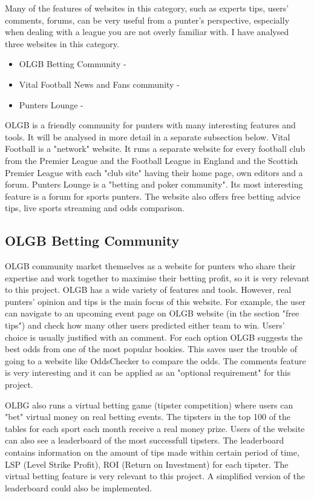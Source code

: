 Many of the features of websites in this category, such as experts tips, users' comments, forums, can be very useful from a punter's perspective, especially when dealing with a league you are not overly familiar with. I have analysed three websites in this category.
	
\begin{itemize}
	\item OLGB Betting Community - \citep{source:olgb}
	\item Vital Football News and Fans community - \citep{source:vitalfootball}
	\item Punters Lounge - \citep{source:punterslounge}
\end{itemize}

OLGB is a friendly community for punters with many interesting features and tools. It will be analysed in more detail in a separate subsection below. Vital Football is a "network" website. It runs a separate website for every football club from the Premier League and the Football League in England and the Scottish Premier League with each "club site" having their home page, own editors and a forum. Punters Lounge is a "betting and poker community". Its most interesting feature is a forum for sports punters. The website also offers free betting advice tips, live sports streaming and odds comparison.
	
\subsection{OLGB Betting Community}
\label{subsec:olgb_req}
OLGB community market themselves as a website for punters who share their expertise and work together to maximise their betting profit, so it is very relevant to this project. OLGB has a wide variety of features and tools. However, real punters' opinion and tips is the main focus of this website. For example, the user can navigate to an upcoming event page on OLGB website (in the section "free tips") and check how many other users predicted either team to win. Users' choice is usually justified with an comment. For each option OLGB suggests the best odds from one of the most popular bookies. This saves user the trouble of going to a website like OddsChecker\cite{oddschecker} to compare the odds. The comments feature is very interesting and it can be applied as an "optional requirement" for this project.

OLBG also runs a virtual betting game (tipster competition) where users can "bet" virtual money on real betting events. The tipsters in the top 100 of the tables for each sport each month receive a real money prize. Users of the website can also see a leaderboard of the most successfull tipsters. The leaderboard contains information on the amount of tips made within certain period of time, LSP (Level Strike Profit), ROI (Return on Investment) for each tipster. The virtual betting feature is very relevant to this project. A simplified version of the leaderboard could also be implemented. 

